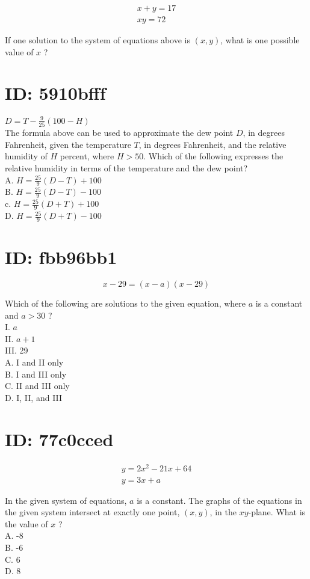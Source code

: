$$
\begin{array}{r}
x+y=17 \\
x y=72
\end{array}
$$

If one solution to the system of equations above is $(x, y)$, what is one possible value of $x$ ?

\section*{ID: 5910bfff}
$D=T-\frac{9}{25}(100-H)$\\
The formula above can be used to approximate the dew point $D$, in degrees Fahrenheit, given the temperature $T$, in degrees Fahrenheit, and the relative humidity of $H$ percent, where $H>50$. Which of the following expresses the relative humidity in terms of the temperature and the dew point?\\
A. $H=\frac{25}{9}(D-T)+100$\\
B. $H=\frac{25}{9}(D-T)-100$\\
c. $H=\frac{25}{9}(D+T)+100$\\
D. $H=\frac{25}{9}(D+T)-100$

\section*{ID: fbb96bb1}
$$
x-29=(x-a)(x-29)
$$

Which of the following are solutions to the given equation, where $a$ is a constant and $a>30$ ?\\
I. $a$\\
II. $a+1$\\
III. 29\\
A. I and II only\\
B. I and III only\\
C. II and III only\\
D. I, II, and III

\section*{ID: 77c0cced}
$$
\begin{gathered}
y=2 x^{2}-21 x+64 \\
y=3 x+a
\end{gathered}
$$

In the given system of equations, $a$ is a constant. The graphs of the equations in the given system intersect at exactly one point, $(x, y)$, in the $x y$-plane. What is the value of $x$ ?\\
A. -8\\
B. -6\\
C. 6\\
D. 8

